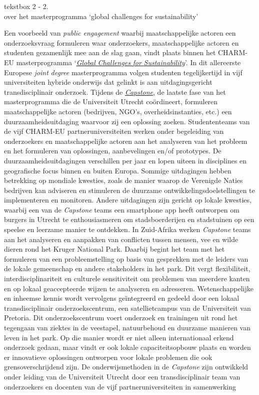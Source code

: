 \documentclass[smallauthor, chapterhaspagenum, nochapterinheader, pagenuminheader,  bigchapnum,medium2, tocpages, garamond, titleinheader]{jote-book}
\begin{document}
	\begin{bookbox}{\raggedright tekstbox 2 - 2. \\over het masterprogramma ‘global challenges for sustainability’}
		Een voorbeeld van \emph{public engagement} waarbij maatschappelijke actoren een onderzoeksvraag formuleren waar onderzoekers, maatschappelijke actoren en studenten gezamenlijk mee aan de slag gaan, vindt plaats binnen het CHARM-EU masterprogramma ‘\href{https://www.charm-eu.eu/masters/globalchallenges}{\emph{Global }\emph{Challenges}\emph{ }\emph{for}\emph{ }\emph{Sustainability}}'. In dit allereerste Europese \emph{joint }\emph{degree} masterprogramma volgen studenten tegelijkertijd in vijf universiteiten hybride onderwijs dat gelinkt is aan uitdagingsgericht transdisciplinair onderzoek. Tijdens de \href{https://www.charm-eu.eu/capstonephase}{\emph{Capstone}}, de laatste fase van het masterprogramma die de Universiteit Utrecht coördineert, formuleren maatschappelijke actoren (bedrijven, NGO's, overheidsinstanties, etc.) een duurzaamheidsuitdaging waarvoor zij een oplossing zoeken. Studententeams van de vijf CHARM-EU partneruniversiteiten werken onder begeleiding van onderzoekers en maatschappelijke actoren aan het analyseren van het probleem en het formuleren van oplossingen, aanbevelingen en/of prototypes. De duurzaamheidsuitdagingen verschillen per jaar en lopen uiteen in disciplines en geografische focus binnen en buiten Europa. Sommige uitdagingen hebben betrekking op mondiale kwesties, zoals de manier waarop de Verenigde Naties bedrijven kan adviseren en stimuleren de duurzame ontwikkelingsdoelstellingen te implementeren en monitoren. Andere uitdagingen zijn gericht op lokale kwesties, waarbij een van de \emph{Capstone} teams een smartphone app heeft ontworpen om burgers in Utrecht te enthousiasmeren om stadsboerderijen en stadstuinen op een speelse en leerzame manier te ontdekken. In Zuid-Afrika werken \emph{Capstone} teams aan het analyseren en aanpakken van conflicten tussen mensen, vee en wilde dieren rond het Kruger National Park. Daarbij begint het team met het formuleren van een probleemstelling op basis van gesprekken met de leiders van de lokale gemeenschap en andere stakeholders in het park. Dit vergt flexibiliteit, interdisciplinariteit en culturele sensitiviteit om problemen van meerdere kanten en op lokaal geaccepteerde wijzen te analyseren en adresseren. Wetenschappelijke en inheemse kennis wordt vervolgens geïntegreerd en gedeeld door een lokaal transdisciplinair onderzoekscentrum, een satellietcampus van de Universiteit van Pretoria. Dit onderzoekscentrum voert onderzoek en trainingen uit rond het tegengaan van ziektes in de veestapel, natuurbehoud en duurzame manieren van leven in het park. Op die manier wordt er niet alleen internationaal erkend onderzoek gedaan, maar vindt er ook lokale capaciteitsopbouw plaats en worden er innovatieve oplossingen ontworpen voor lokale problemen die ook grensoverschrijdend zijn. De onderwijsmethoden in de \emph{Capstone} zijn ontwikkeld onder leiding van de Universiteit Utrecht door een transdisciplinair team van onderzoekers en docenten van de vijf partneruniversiteiten in samenwerking 
\end{bookbox}
\end{document}
